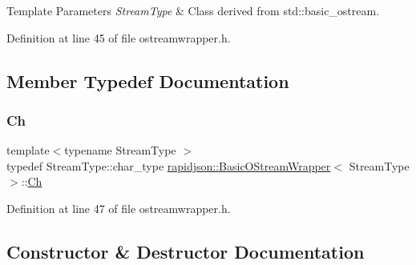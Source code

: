 \begin{DoxyTemplParams}{Template Parameters}
{\em Stream\+Type} & Class derived from {\ttfamily std\+::basic\+\_\+ostream}. \\
\hline
\end{DoxyTemplParams}


Definition at line 45 of file ostreamwrapper.\+h.



\subsection{Member Typedef Documentation}
\mbox{\label{classrapidjson_1_1_basic_o_stream_wrapper_a615d4f601af4c039c9087a50578226b0}} 
\subsubsection{\texorpdfstring{Ch}{Ch}}
{\footnotesize\ttfamily template$<$typename Stream\+Type $>$ \\
typedef Stream\+Type\+::char\+\_\+type \mbox{\hyperlink{classrapidjson_1_1_basic_o_stream_wrapper}{rapidjson\+::\+Basic\+O\+Stream\+Wrapper}}$<$ Stream\+Type $>$\+::\mbox{\hyperlink{classrapidjson_1_1_basic_o_stream_wrapper_a615d4f601af4c039c9087a50578226b0}{Ch}}}



Definition at line 47 of file ostreamwrapper.\+h.



\subsection{Constructor \& Destructor Documentation}
\mbox{\label{classrapidjson_1_1_basic_o_stream_wrapper_a68222d18ea4a16917b374ca53f78bbcd}} 
